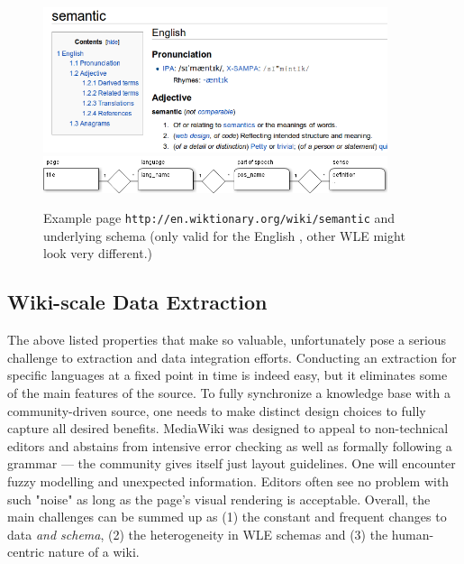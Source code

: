 \begin{figure}[tb]
\centering
\includegraphics[width=0.9\textwidth]{./images/example-page.png}
\vspace{0.3cm}
\hspace{0.1cm}
\includegraphics[width=0.9\textwidth]{./images/entrylayout.png}
\caption{Example page \texttt{http://en.wiktionary.org/wiki/semantic} and underlying schema (only valid for the English \wik, other WLE might look very different.)}
\label{fig:example}
\end{figure}

\subsection{Wiki-scale Data Extraction}
The above listed properties that make \wik so valuable, unfortunately pose a serious challenge to extraction and data integration efforts. 
Conducting an extraction for specific languages at a fixed point in time is indeed easy, but it eliminates some of the main features of the source. 
To fully synchronize a knowledge base with a community-driven source, one needs to make distinct design choices to fully capture all desired benefits.
MediaWiki was designed to appeal to non-technical editors and abstains from intensive error checking as well as formally following a grammar --- the community gives itself just layout guidelines. 
One will encounter fuzzy modelling and unexpected information. 
Editors often see no problem with such "noise" as long as the page's visual rendering is acceptable.  
Overall, the main challenges can be summed up as (1) the constant and frequent changes to data \textit{and schema}, (2) the heterogeneity in WLE schemas and (3) the human-centric nature of a wiki. 

\newpage
